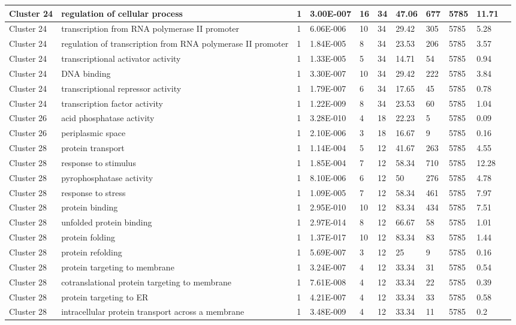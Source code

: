 \begin{tabular}{|l|l|l|l|l|l|l|l|l|l|l|}
\hline
Cluster 24&regulation of cellular process&1&3.00E-007&16&34&47.06&677&5785&11.71&\\
\hline
Cluster 24&transcription from RNA polymerase II promoter&1&6.06E-006&10&34&29.42&305&5785&5.28&\\
\hline
Cluster 24&regulation of transcription from RNA polymerase II promoter&1&1.84E-005&8&34&23.53&206&5785&3.57&\\
\hline
Cluster 24&transcriptional activator activity&1&1.33E-005&5&34&14.71&54&5785&0.94&\\
\hline
Cluster 24&DNA binding&1&3.30E-007&10&34&29.42&222&5785&3.84&\\
\hline
Cluster 24&transcriptional repressor activity&1&1.79E-007&6&34&17.65&45&5785&0.78&\\
\hline
Cluster 24&transcription factor activity&1&1.22E-009&8&34&23.53&60&5785&1.04&\\
\hline
Cluster 26&acid phosphatase activity&1&3.28E-010&4&18&22.23&5&5785&0.09&\\
\hline
Cluster 26&periplasmic space&1&2.10E-006&3&18&16.67&9&5785&0.16&\\
\hline
Cluster 28&protein transport&1&1.14E-004&5&12&41.67&263&5785&4.55&\\
\hline
Cluster 28&response to stimulus&1&1.85E-004&7&12&58.34&710&5785&12.28&\\
\hline
Cluster 28&pyrophosphatase activity&1&8.10E-006&6&12&50&276&5785&4.78&\\
\hline
Cluster 28&response to stress&1&1.09E-005&7&12&58.34&461&5785&7.97&\\
\hline
Cluster 28&protein binding&1&2.95E-010&10&12&83.34&434&5785&7.51&\\
\hline
Cluster 28&unfolded protein binding&1&2.97E-014&8&12&66.67&58&5785&1.01&\\
\hline
Cluster 28&protein folding&1&1.37E-017&10&12&83.34&83&5785&1.44&\\
\hline
Cluster 28&protein refolding&1&5.69E-007&3&12&25&9&5785&0.16&\\
\hline
Cluster 28&protein targeting to membrane&1&3.24E-007&4&12&33.34&31&5785&0.54&\\
\hline
Cluster 28&cotranslational protein targeting to membrane&1&7.61E-008&4&12&33.34&22&5785&0.39&\\
\hline
Cluster 28&protein targeting to ER&1&4.21E-007&4&12&33.34&33&5785&0.58&\\
\hline
Cluster 28&intracellular protein transport across a membrane&1&3.48E-009&4&12&33.34&11&5785&0.2&\\

\end{tabular}
